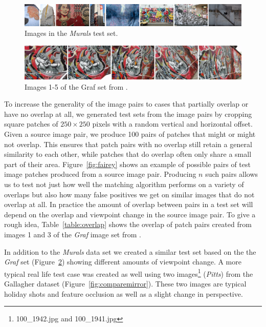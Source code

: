 \begin{figure}[t]
	\centering
	\includegraphics[width=\textwidth]{images/murals}
	\caption{Images in the \emph{Murals} test set.}
	\label{fig:murals}
\end{figure}

\begin{figure}[tb]
	\centering
	\includegraphics[width=\columnwidth]{images/graf12345.jpg}
	\caption{Images 1-5 of the Graf set from \cite{mikolajczyk2005performance}.}
	\label{fig:Graf}
\end{figure}

To increase the generality of the image pairs to cases that partially 
overlap or have no overlap at all, we generated test sets from the image 
pairs by cropping square patches of $250\!\times\!250$ pixels with a 
random vertical and horizontal offset.  Given a source image pair, we 
produce 100 pairs of patches that might or might not overlap.  This 
ensures that patch pairs with no overlap still retain a general 
similarity to each other, while patches that do overlap often only share 
a small part of their area.  Figure~\ref{fig:fairey} shows an example of 
possible pairs of test image patches produced from a source image pair.  
Producing $n$ such pairs allows us to test not just how well the 
matching algorithm performs on a variety of overlaps but also how many 
false positives we get on similar images that do not overlap at all. In 
practice the amount of overlap between pairs in a test set will depend 
on the overlap and viewpoint change in the source image pair.  To give a 
rough idea, Table~\ref{table:overlap} shows the overlap of patch pairs 
created from images 1 and 3 of the \emph{Graf} image set from 
\cite{mikolajczyk2005performance}.

In addition to the \emph{Murals} data set we created a similar test set
based on the the \emph{Graf} set (Figure~\ref{fig:Graf}) showing 
different amounts of viewpoint change. A more typical real life test 
case was created as well using two images\footnote{100\_1942.jpg and 
100\_1941.jpg} (\emph{Pitts}) from the Gallagher dataset 
\cite{gallagher2008} (Figure~\ref{fig:comparemirror}). These two images 
are typical holiday shots and feature occlusion as well as a slight 
change in perspective.

